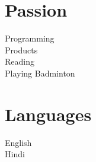 \documentclass[]{gagan-resume}
\begin{document}
\begin{minipage}[t]{0.33\textwidth}



\vspace{\topsep}
\vspace{\topsep}
\vspace{\topsep}
\vspace{\topsep}




\section{Passion}
Programming \\
Products \\
Reading \\
Playing Badminton \\
\sectionsep




\section{Languages}
English \\
Hindi \\
\sectionsep



\end{minipage} 
\hfill
\end{document}
